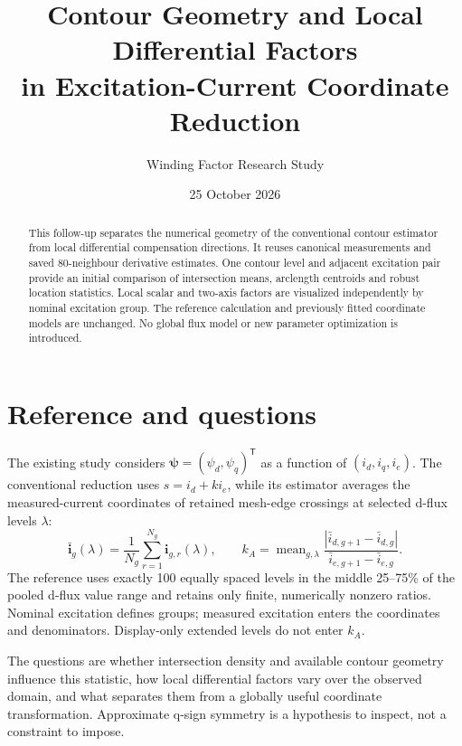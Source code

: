 \documentclass[11pt,a4paper]{article}
\title{Contour Geometry and Local Differential Factors\\in Excitation-Current Coordinate Reduction}
\author{Winding Factor Research Study}
\date{25 October 2026}
\begin{document}
\maketitle
\begin{abstract}
This follow-up separates the numerical geometry of the conventional contour estimator from local differential compensation directions. It reuses canonical measurements and saved 80-neighbour derivative estimates. One contour level and adjacent excitation pair provide an initial comparison of intersection means, arclength centroids and robust location statistics. Local scalar and two-axis factors are visualized independently by nominal excitation group. The reference calculation and previously fitted coordinate models are unchanged. No global flux model or new parameter optimization is introduced.
\end{abstract}

\section{Reference and questions}
The existing study considers $\bm\psi=(\psi_d,\psi_q)^\mathsf T$ as a function of $(i_d,i_q,i_e)$. The conventional reduction uses $s=i_d+k i_e$, while its estimator averages the measured-current coordinates of retained mesh-edge crossings at selected d-flux levels $\lambda$:
\begin{equation}
\bar{\bm i}_g(\lambda)=\frac{1}{N_g}\sum_{r=1}^{N_g}\bm i_{g,r}(\lambda),\qquad
k_A=\operatorname{mean}_{g,\lambda}\frac{|\bar i_{d,g+1}-\bar i_{d,g}|}{\bar i_{e,g+1}-\bar i_{e,g}}.
\end{equation}
The reference uses exactly 100 equally spaced levels in the middle 25--75\% of the pooled d-flux value range and retains only finite, numerically nonzero ratios. Nominal excitation defines groups; measured excitation enters the coordinates and denominators. Display-only extended levels do not enter $k_A$.

The questions are whether intersection density and available contour geometry influence this statistic, how local differential factors vary over the observed domain, and what separates them from a globally useful coordinate transformation. Approximate q-sign symmetry is a hypothesis to inspect, not a constraint to impose.
\end{document}
